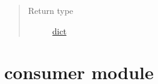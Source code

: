 \documentclass[letterpaper,10pt,english]{sphinxmanual}
\begin{document}
\begin{fulllineitems}
\begin{fulllineitems}
\begin{quote}
\begin{description}
\item[{Return type}] \leavevmode
\href{https://docs.python.org/2/library/stdtypes.html\#dict}{dict}

\end{description}\end{quote}

\end{fulllineitems}


\end{fulllineitems}



\chapter{consumer module}
\label{\detokenize{consumer:module-consumer}}\label{\detokenize{consumer:consumer-module}}\label{\detokenize{consumer::doc}}
\end{document}
